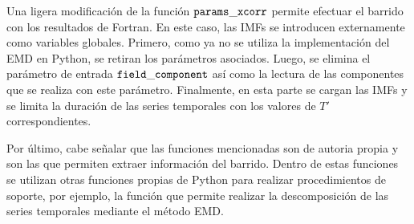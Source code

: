 Una ligera modificación de la función ${\tt params\char`_xcorr}$ permite efectuar el barrido con los resultados de Fortran. En este caso, las IMFs se introducen externamente como variables globales. Primero, como ya no se utiliza la implementación del EMD en Python, se retiran los parámetros asociados. Luego, se elimina el parámetro de entrada ${\tt field\char`_component}$ así como la lectura de las componentes que se realiza con este parámetro. Finalmente, en esta parte se cargan las IMFs y se limita la duración de las series temporales con los valores de $T'$ correspondientes.

Por último, cabe señalar que las funciones mencionadas son de autoria propia y son las que permiten extraer información del barrido. Dentro de estas funciones se utilizan otras funciones propias de Python para realizar procedimientos de soporte, por ejemplo, la función que permite realizar la descomposición de las series temporales mediante el método EMD. 